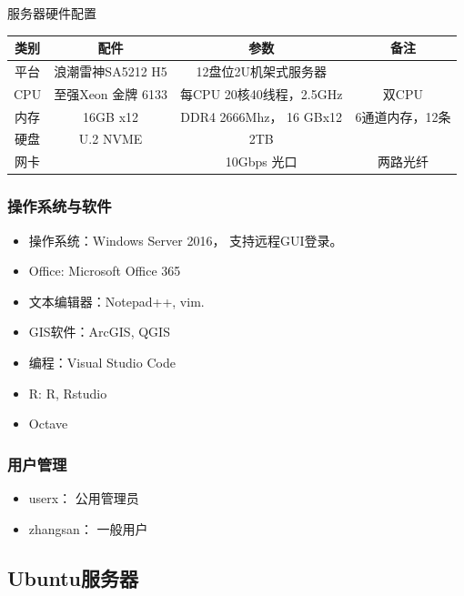 \documentclass[
]{book}
\providecommand{\tightlist}{%
  \setlength{\itemsep}{0pt}\setlength{\parskip}{0pt}}
\begin{document}
服务器硬件配置

\begin{longtable}[]{@{}cccc@{}}
\toprule()
类别 & 配件 & 参数 & 备注 \\
\midrule()
\endhead
平台 & 浪潮雷神SA5212 H5 & 12盘位2U机架式服务器 & \\
CPU & 至强Xeon 金牌 6133 & 每CPU 20核40线程，2.5GHz & 双CPU \\
内存 & 16GB x12 & DDR4 2666Mhz， 16 GBx12 & 6通道内存，12条 \\
硬盘 & U.2 NVME & 2TB & \\
网卡 & & 10Gbps 光口 & 两路光纤 \\
\bottomrule()
\end{longtable}

\hypertarget{ux64cdux4f5cux7cfbux7edfux4e0eux8f6fux4ef6}{%
\subsubsection{操作系统与软件}\label{ux64cdux4f5cux7cfbux7edfux4e0eux8f6fux4ef6}}

\begin{itemize}
\tightlist
\item
  操作系统：Windows Server 2016， 支持远程GUI登录。
\item
  Office: Microsoft Office 365
\item
  文本编辑器：Notepad++, vim.
\item
  GIS软件：ArcGIS, QGIS
\item
  编程：Visual Studio Code
\item
  R: R, Rstudio
\item
  Octave
\end{itemize}

\hypertarget{ux7528ux6237ux7ba1ux7406}{%
\subsubsection{用户管理}\label{ux7528ux6237ux7ba1ux7406}}

\begin{itemize}
\tightlist
\item
  userx： 公用管理员
\item
  zhangsan： 一般用户
\end{itemize}

\hypertarget{ubuntuux670dux52a1ux5668}{%
\subsection{Ubuntu服务器}\label{ubuntuux670dux52a1ux5668}}
\end{document}
